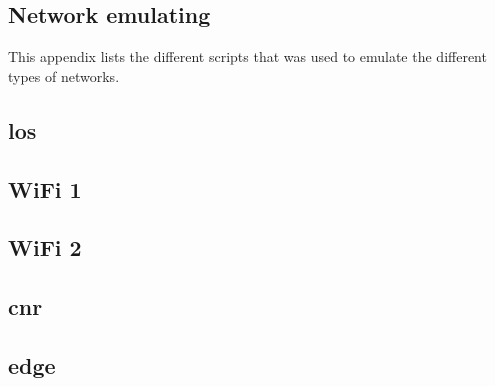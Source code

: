 \begin{appendices}


\chapter{Network emulating}

\label{appendix-netem-scripts}

This appendix lists the different scripts that was used to emulate the different
types of networks.




\section{\gls{los}}


\section{WiFi 1}


\section{WiFi 2}


\section{\gls{cnr}}


\section{\gls{edge}}





\end{appendices}
